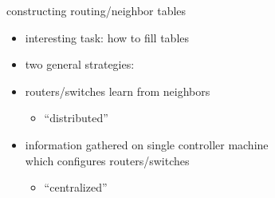 \begin{frame}{constructing routing/neighbor tables}
    \begin{itemize}
    \item interesting task: how to fill tables
    \item two general strategies:
    \vspace{.5cm}
    \item routers/switches learn from neighbors
        \begin{itemize}
        \item ``distributed''
        \end{itemize}
    \item information gathered on single controller machine \\
        which configures routers/switches
        \begin{itemize}
        \item ``centralized''
        \end{itemize}
    \end{itemize}
\end{frame}

